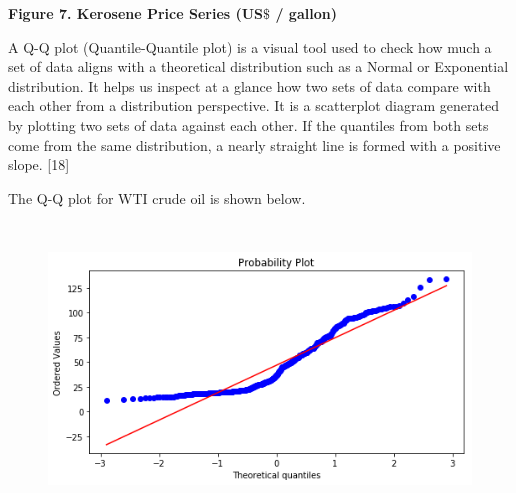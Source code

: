 \documentclass[12pt,twoside]{article}
\begin{document}
\vspace{\baselineskip}
\vspace{\baselineskip}
\vspace{\baselineskip}\begin{Center}
{\fontsize{11pt}{13.2pt}\selectfont \textbf{Figure 7. Kerosene Price Series (US$\$$  / gallon)}\par}
\end{Center}\par


\vspace{\baselineskip}
\par

\begin{justify}
{\fontsize{11pt}{13.2pt}\selectfont A Q-Q plot (Quantile-Quantile plot) is a visual tool used to check how much a set of data aligns with a theoretical distribution such as a Normal or Exponential distribution. It helps us inspect at a glance how two sets of data compare with each other from a distribution perspective. It is a scatterplot diagram generated by plotting two sets of data against each other. If the quantiles from both sets come from the same distribution, a nearly straight line is formed with a positive slope. \textcolor[HTML]{FF0000}{[18]}\par}
\end{justify}\par

\begin{justify}
{\fontsize{11pt}{13.2pt}\selectfont The Q-Q plot for WTI crude oil is shown below.\par}
\end{justify}\par




\begin{figure}[H]
	\begin{Center}
		\includegraphics[width=5.53in,height=3.04in]{./media/image7.png}
	\end{Center}
\end{figure}
\end{document}

